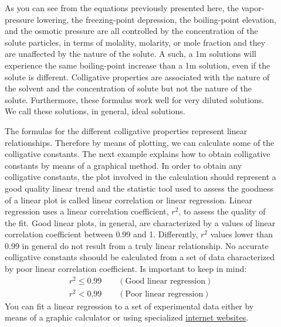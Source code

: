 \documentclass[main.tex]{subfiles}
\newcommand\chapterlabel{Ch-solutions}\setcounter{figurenewcounter}{0}\setcounter{tablenewcounter}{0}\setcounter{formulanewcounter}{0}
\begin{document}
\begin{description}
\item[] 
As you can see from the equations previously presented here, the vapor-pressure lowering, the freezing-point depression, the boiling-point elevation, and the osmotic pressure are all controlled by the concentration of the solute particles, in terms of molality, molarity, or mole fraction and they are unaffected by the nature of the solute. A such, a 1m  solutions will experience the same boiling-point increase than a 1m  solution, even if the solute is different. Colligative properties are associated with the nature of the solvent and the concentration of solute but not the nature of the solute. Furthermore, these formulas work well for very diluted solutions. We call these solutions, in general, ideal solutions.



\item[] 
The formulas for the different colligative properties represent linear relationships. Therefore by means of plotting, we can calculate some of the colligative constants. The next example explains how to obtain colligative constants by means of a graphical method. In order to obtain any colligative constants, the plot involved in the calculation should represent a good quality linear trend and the statistic tool used to assess the goodness of a linear plot is called linear correlation or linear regression. Linear regression uses a linear correlation coefficient, $r^2$, to assess the quality of the fit.
Good linear plots, in general, are characterized by a values of linear correlation coefficient between 0.99 and 1. Differently, $r^2$ values lower than 0.99 in general do not result from a truly linear relationship. No accurate colligative constants shoould be calculated from a set of data characterized by poor linear correlation coefficient. Is important to keep in mind:
\begin{equation}\begin{split}
r^2\leq0.99 \quad \quad (\text{Good linear regression})\label{\chapterlabel:equation16}\\
r^2<0.99 \quad \quad (\text{Poor linear regression}) 
\end{split}\end{equation}
You can fit a linear regression to a set of experimental data either by means of a graphic calculator or using specialized \href{http://www.alcula.com/calculators/statistics/linear-regression/#gsc.tab=0}{internet websites}.



\end{description}
\end{document}
